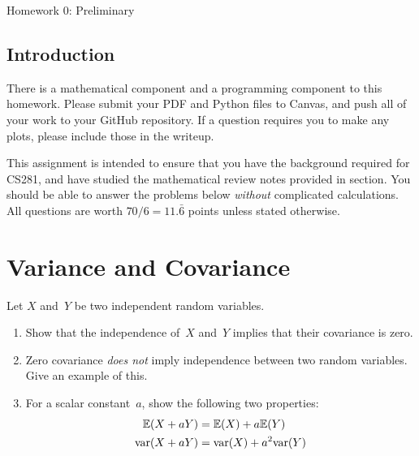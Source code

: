 \documentclass[submit]{harvardml}
\newcommand{\E}{\mathbb{E}}
\begin{document}
\begin{center}
    {\Large Homework 0: Preliminary}
\end{center}

\subsection*{Introduction}

There is a mathematical component and a programming component to this homework.
Please submit your PDF and Python files to Canvas, and push all of your work
to your GitHub repository. If a question requires you to make any plots,
please include those in the writeup.

This assignment is intended to ensure that you have the background required for CS281,
and have studied the mathematical review notes provided in section.
You should be able to answer the problems below \textit{without} complicated calculations.
All questions are worth $70/6 = 11.\bar{6}$ points unless stated otherwise.

\newpage



\section*{Variance and Covariance}
\begin{problem}
Let $X$ and~$Y$ be two independent random variables.

\begin{enumerate}[label=(\alph*)]
\item Show that the independence of~$X$ and~$Y$ implies that their
covariance is zero.

\item Zero covariance \textit{does not} imply independence between two
      random variables. Give an example of this.

\item For a scalar constant~$a$, show the following two properties:
\begin{align*}
  \E(X + aY) &= \E(X) + a\E(Y)\\
  \var(X + aY) &= \var(X) + a^2\var(Y)
\end{align*}
\end{enumerate}
\end{problem}
\end{document}
